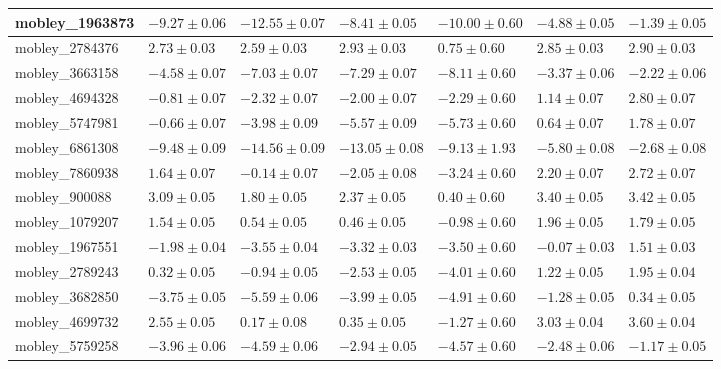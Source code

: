 \documentclass{article}
\begin{document}
\begin{landscape}
\begin{longtable}{|l{3.0cm}|l{3.0cm}|l{3.2cm}|l{3.6cm}|l{3.0cm}|l{3.0cm}|l{3.0cm}|}
mobley\_1963873	&	$	-9.27	\pm	0.06	$	&	$	-12.55	\pm	0.07	$	&	$	-8.41	\pm	0.05	$	&	$	-10.00	\pm	0.60	$	&	$	-4.88	\pm	0.05	$	&	$	-1.39	\pm	0.05	$	\\ \hline
mobley\_2784376	&	$	2.73	\pm	0.03	$	&	$	2.59	\pm	0.03	$	&	$	2.93	\pm	0.03	$	&	$	0.75	\pm	0.60	$	&	$	2.85	\pm	0.03	$	&	$	2.90	\pm	0.03	$	\\ \hline
mobley\_3663158	&	$	-4.58	\pm	0.07	$	&	$	-7.03	\pm	0.07	$	&	$	-7.29	\pm	0.07	$	&	$	-8.11	\pm	0.60	$	&	$	-3.37	\pm	0.06	$	&	$	-2.22	\pm	0.06	$	\\ \hline
mobley\_4694328	&	$	-0.81	\pm	0.07	$	&	$	-2.32	\pm	0.07	$	&	$	-2.00	\pm	0.07	$	&	$	-2.29	\pm	0.60	$	&	$	1.14	\pm	0.07	$	&	$	2.80	\pm	0.07	$	\\ \hline
mobley\_5747981	&	$	-0.66	\pm	0.07	$	&	$	-3.98	\pm	0.09	$	&	$	-5.57	\pm	0.09	$	&	$	-5.73	\pm	0.60	$	&	$	0.64	\pm	0.07	$	&	$	1.78	\pm	0.07	$	\\ \hline
mobley\_6861308	&	$	-9.48	\pm	0.09	$	&	$	-14.56	\pm	0.09	$	&	$	-13.05	\pm	0.08	$	&	$	-9.13	\pm	1.93	$	&	$	-5.80	\pm	0.08	$	&	$	-2.68	\pm	0.08	$	\\ \hline
mobley\_7860938	&	$	1.64	\pm	0.07	$	&	$	-0.14	\pm	0.07	$	&	$	-2.05	\pm	0.08	$	&	$	-3.24	\pm	0.60	$	&	$	2.20	\pm	0.07	$	&	$	2.72	\pm	0.07	$	\\ \hline
mobley\_900088	&	$	3.09	\pm	0.05	$	&	$	1.80	\pm	0.05	$	&	$	2.37	\pm	0.05	$	&	$	0.40	\pm	0.60	$	&	$	3.40	\pm	0.05	$	&	$	3.42	\pm	0.05	$	\\ \hline
mobley\_1079207	&	$	1.54	\pm	0.05	$	&	$	0.54	\pm	0.05	$	&	$	0.46	\pm	0.05	$	&	$	-0.98	\pm	0.60	$	&	$	1.96	\pm	0.05	$	&	$	1.79	\pm	0.05	$	\\ \hline
mobley\_1967551	&	$	-1.98	\pm	0.04	$	&	$	-3.55	\pm	0.04	$	&	$	-3.32	\pm	0.03	$	&	$	-3.50	\pm	0.60	$	&	$	-0.07	\pm	0.03	$	&	$	1.51	\pm	0.03	$	\\ \hline
mobley\_2789243	&	$	0.32	\pm	0.05	$	&	$	-0.94	\pm	0.05	$	&	$	-2.53	\pm	0.05	$	&	$	-4.01	\pm	0.60	$	&	$	1.22	\pm	0.05	$	&	$	1.95	\pm	0.04	$	\\ \hline
mobley\_3682850	&	$	-3.75	\pm	0.05	$	&	$	-5.59	\pm	0.06	$	&	$	-3.99	\pm	0.05	$	&	$	-4.91	\pm	0.60	$	&	$	-1.28	\pm	0.05	$	&	$	0.34	\pm	0.05	$	\\ \hline
mobley\_4699732	&	$	2.55	\pm	0.05	$	&	$	0.17	\pm	0.08	$	&	$	0.35	\pm	0.05	$	&	$	-1.27	\pm	0.60	$	&	$	3.03	\pm	0.04	$	&	$	3.60	\pm	0.04	$	\\ \hline
mobley\_5759258	&	$	-3.96	\pm	0.06	$	&	$	-4.59	\pm	0.06	$	&	$	-2.94	\pm	0.05	$	&	$	-4.57	\pm	0.60	$	&	$	-2.48	\pm	0.06	$	&	$	-1.17	\pm	0.05	$	\\ \hline

\end{longtable}
\end{landscape}
\end{document}
